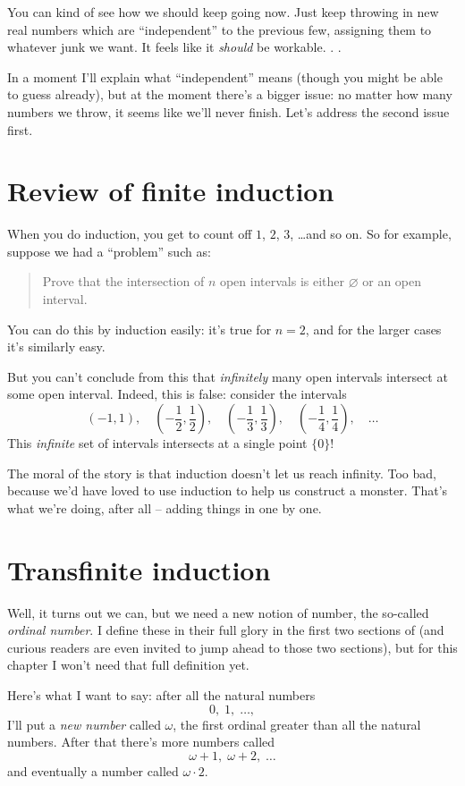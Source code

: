 You can kind of see how we should keep going now.
Just keep throwing in new real numbers which are ``independent''
to the previous few, assigning them to whatever junk we want.
It feels like it \emph{should} be workable. . .

In a moment I'll explain what ``independent'' means (though you
might be able to guess already), but at the moment there's a bigger issue:
no matter how many numbers we throw, it seems like we'll never finish.
Let's address the second issue first.

\section{Review of finite induction}
When you do induction, you get to count off $1$, $2$, $3$, \dots and so on.
So for example, suppose we had a ``problem'' such as:
\begin{quote}
	Prove that the intersection of $n$ open intervals is either $\varnothing$
	or an open interval.
\end{quote}
You can do this by induction easily: it's true for $n = 2$, and
for the larger cases it's similarly easy.

But you can't conclude from this that \emph{infinitely} many open intervals intersect
at some open interval. Indeed, this is false: consider the intervals
\[
	\left( -1, 1 \right), \quad
	\left( -\frac12, \frac12 \right), \quad
	\left( -\frac13, \frac13 \right), \quad
	\left( -\frac14, \frac14 \right), \quad
	\dots
\]
This \emph{infinite} set of intervals intersects at a single point $\{0\}$!

The moral of the story is that induction doesn't let us reach infinity.
Too bad, because we'd have loved to use induction to help us construct a monster.
That's what we're doing, after all -- adding things in one by one.

\section{Transfinite induction}
Well, it turns out we can, but we need a new notion of number,
the so-called \emph{ordinal number}.
I define these in their full glory in the first two sections of 
(and curious readers are even invited to jump ahead to those two sections),
but for this chapter I won't need that full definition yet.

Here's what I want to say: after all the natural numbers
\[ 0, \; 1, \; \dots, \]
I'll put a \emph{new number} called $\omega$,
the first ordinal greater than all the natural numbers.
After that there's more numbers called
\[\omega+1, \; \omega+2, \; \dots \]
and eventually a number called $\omega \cdot 2$.

